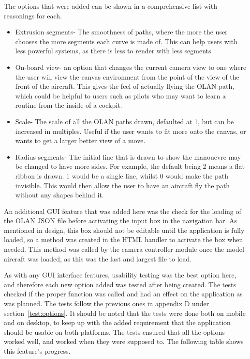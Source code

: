 The options that were added can be shown in a comprehensive list with reasonings for each.
\begin{itemize}
	\item Extrusion segments- The smoothness of paths, where the more the user chooses the more segments each curve is made of. This can help users with less powerful systems, as there is less to render with less segments.
	\item On-board view- an option that changes the current camera view to one where the user will view the canvas environment from the point of the view of the front of the aircraft. This gives the feel of actually flying the OLAN path, which could be helpful to users such as pilots who may want to learn a routine from the inside of a cockpit.
	\item Scale- The scale of all the OLAN paths drawn, defaulted at 1, but can be increased in multiples. Useful if the user wants to fit more onto the canvas, or wants to get a larger better view of a move.
	\item Radius segments- The initial line that is drawn to show the manouevre may be changed to have more sides. For example, the default being 2 means a flat ribbon is drawn. 1 would be a single line, whilst 0 would make the path invisible. This would then allow the user to have an aircraft fly the path without any shapes behind it.
\end{itemize}

An additional GUI feature that was added here was the check for the loading of the OLAN JSON file before activating the input box in the navigation bar. As mentioned in design, this box should not be editable until the application is fully loaded, so a method was created in the HTML handler to activate the box when needed. This method was called by the camera controller module once the model aircraft was loaded, as this was the last and largest file to load.

As with any GUI interface features, usability testing was the best option here, and therefore each new option added was tested after being created. The tests checked if the proper function was called and had an effect on the application as was planned. The tests follow the previous ones in appendix D under section~\ref{test:options}. It should be noted that the tests were done both on mobile and on desktop, to keep up with the added requirement that the application should be usable on both platforms. The tests ensured that all the options worked well, and worked when they were supposed to. The following table shows this feature's progress.

